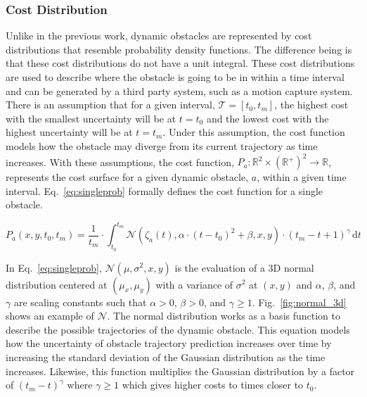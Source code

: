 \documentclass[letterpaper, 10pt, conference]{ieeeconf}
\begin{document}
\subsubsection{Cost Distribution}

\label{sec:cost}

Unlike in the previous work, dynamic obstacles are represented by cost
distributions that resemble probability density functions. The difference being
is that these cost distributions do not have a unit integral. These cost
distributions are used to describe where the obstacle is going to be in within
a time interval and can be generated by a third party system, such as a motion
capture system. There is an assumption that for a given interval, $\mathcal{T}
= [t_0, t_m]$, the highest cost with the smallest uncertainty will be at $t =
t_0$ and the lowest cost with the highest uncertainty will be at $t = t_m$.
Under this assumption, the cost function models how the obstacle may diverge
from its current trajectory as time increases. With these assumptions, the cost
function, $P_a: \mathbb{R}^2 \times (\mathbb{R}^+)^2 \rightarrow
\mathbb{R}$, represents the cost surface for a given dynamic obstacle, $a$,
within a given time interval. Eq.~\ref{eq:singleprob} formally defines the cost
function for a single obstacle.


\begin{equation}
    P_a(x, y, t_0, t_m) = \frac{1}{t_m} \cdot \int^{t_m}_{t_0}
    \mathcal{N}(\zeta_a(t), \alpha \cdot (t - t_0)^2 + \beta, x, y) \cdot
    (t_m - t + 1)^{\gamma} \,\mathrm{d}t
    \label{eq:singleprob}
\end{equation}

In Eq.~\ref{eq:singleprob}, $\mathcal{N}(\mu, \sigma^2, x, y)$ is the
evaluation of a 3D normal distribution centered at $(\mu_x, \mu_y)$ with a
variance of $\sigma^2$ at $(x, y)$ and $\alpha$, $\beta$, and $\gamma$ are
scaling constants such that $\alpha > 0$, $\beta > 0$, and $\gamma \geq 1$.
Fig.~\ref{fig:normal_3d} shows an example of $\mathcal{N}$. The normal
distribution works as a basis function to describe the possible trajectories of
the dynamic obstacle. This equation models how the uncertainty of obstacle
trajectory prediction increases over time by increasing the standard deviation
of the Gaussian distribution as the time increases.  Likewise, this function
multiplies the Gaussian distribution by a factor of $(t_m - t)^{\gamma}$ where
$\gamma \geq 1$ which gives higher costs to times closer to $t_0$.
\end{document}
